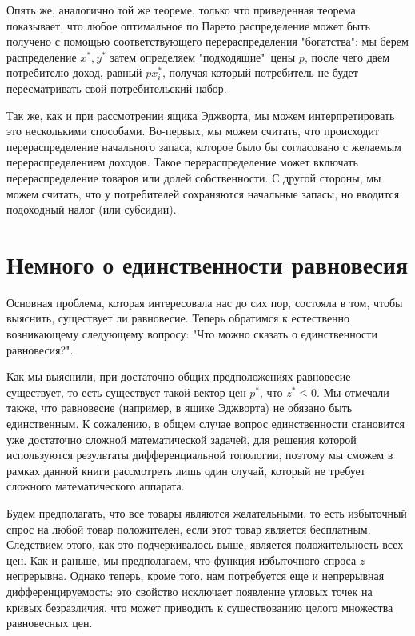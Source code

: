 Опять же, аналогично той же теореме, только что приведенная теорема
показывает, что любое оптимальное по Парето распределение
может быть получено с помощью соответствующего перераспределения
"богатства": мы берем распределение $x^*,y^*$ затем определяем
"подходящие"\, цены $p$, после чего даем потребителю доход, равный
$px^*_i$, получая который потребитель не будет пересматривать свой
потребительский набор.

Так же, как и при рассмотрении ящика Эджворта, мы можем интерпретировать
это несколькими способами. Во-первых, мы можем считать, что происходит
перераспределение начального запаса, которое было бы согласовано с
желаемым перераспределением доходов. Такое перераспределение может включать
перераспределение товаров или долей собственности. С другой стороны, мы можем
считать, что у потребителей сохраняются начальные запасы, но вводится
подоходный налог (или субсидии).


\section*{Немного о единственности равновесия}

Основная проблема, которая интересовала нас до сих пор, состояла в
том, чтобы выяснить, существует ли равновесие. Теперь обратимся к
естественно возникающему следующему вопросу: "Что можно сказать о
единственности равновесия?".

Как мы выяснили, при достаточно общих предположениях равновесие
существует, то есть существует такой вектор цен $p^*$, что
$z^*\leq0$. Мы отмечали также, что равновесие (например, в ящике
Эджворта) не обязано быть единственным. К сожалению, в общем случае
вопрос единственности становится уже достаточно сложной
математической задачей, для решения которой используются результаты
дифференциальной топологии, поэтому мы сможем в рамках данной книги
рассмотреть лишь один случай, который не требует сложного
математического аппарата.

Будем предполагать, что все товары являются желательными, то есть
избыточный спрос на любой товар положителен, если этот товар
является бесплатным. Следствием этого, как это подчеркивалось выше,
является положительность всех цен. Как и раньше, мы предполагаем,
что функция избыточного спроса $z$ непрерывна. Однако теперь, кроме
того, нам потребуется еще и непрерывная дифференцируемость: это
свойство исключает появление угловых точек на кривых безразличия,
что может приводить к существованию целого множества равновесных
цен.

